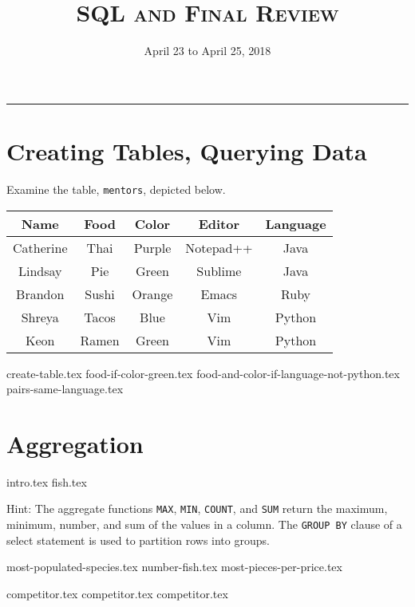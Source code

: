 \documentclass{exam}
\title{\textsc{SQL and Final Review}}
\date{April 23 to April 25, 2018}
\begin{document}
\maketitle
\rule{\textwidth}{0.15em}
\fontsize{12}{15}\selectfont

\section{Creating Tables, Querying Data}
Examine the table, \texttt{mentors}, depicted below.

\begin{center}
\begin{tabular}{|c|c|c|c|c|}
 \hline
 \textbf{Name} & \textbf{Food} & \textbf{Color} & \textbf{Editor} & \textbf{Language} \\
 \hline
 Catherine & Thai & Purple & Notepad++ & Java \\
 \hline
 Lindsay & Pie & Green & Sublime & Java \\
 \hline
 Brandon & Sushi & Orange & Emacs & Ruby \\
 \hline
 Shreya & Tacos & Blue & Vim & Python \\
 \hline
 Keon & Ramen & Green & Vim & Python \\
 \hline
\end{tabular}
\end{center}

\begin{questions}
{create-table.tex}
\newpage
{food-if-color-green.tex}
{food-and-color-if-language-not-python.tex}
{pairs-same-language.tex}
\end{questions}

\newpage
\section{Aggregation}
{intro.tex}
{fish.tex}

Hint: The aggregate functions \texttt{MAX}, \texttt{MIN}, \texttt{COUNT}, and \texttt{SUM} return the maximum, minimum, number, and sum of the values in a column. The  \texttt{GROUP BY} clause of a select statement is used to partition rows into groups.

\begin{questions}
{most-populated-species.tex}
{number-fish.tex}
{most-pieces-per-price.tex}

\newpage
{competitor.tex}
{competitor.tex}
{competitor.tex}
\end{questions}
\end{document}
